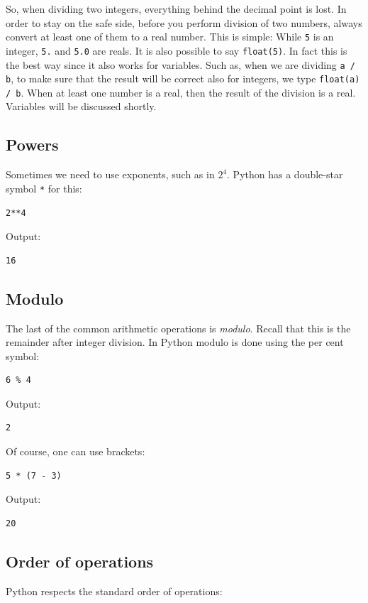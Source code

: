 \documentclass[article,A4,12pt]{llncs}
\begin{document}
\vspace{4mm}
\noindent
So, when dividing two integers, everything behind the decimal point is lost.
In order to stay on the safe side, 
before you perform division of two numbers, always convert at least one of them
to a real number. This is simple: While {\tt 5} is an integer, {\tt 5.}
and {\tt 5.0} are reals. It is also possible to 
say {\tt float(5)}. In fact this is the best way since it also works for 
variables. Such as, when we are dividing {\tt a / b}, to make sure that 
the result will be correct also for integers, we type {\tt float(a) / b}. 
When at least one number is a real, then the result of the division is a real.   
Variables will be discussed shortly.

\subsection{Powers}
Sometimes we need to use exponents, such as in $2^4$. Python has a double-star
symbol {\tt **} for this:

\begin{verbatim}
2**4
\end{verbatim}
Output:

\begin{verbatim}
16
\end{verbatim}
\subsection{Modulo}
The last of the common arithmetic operations is {\em modulo}. Recall that this is the remainder 
after integer division. In Python modulo is done using the per cent symbol:

\begin{verbatim}
6 % 4
\end{verbatim}
Output:

\begin{verbatim}
2
\end{verbatim}
Of course, one can use brackets:

\begin{verbatim}
5 * (7 - 3)
\end{verbatim}
Output:

\begin{verbatim}
20
\end{verbatim}
\subsection{Order of operations}
Python respects the standard order of operations:
\end{document}
